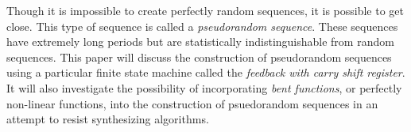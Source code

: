 \par Though it is impossible to create perfectly random sequences, it is possible to get close.
This type of sequence is called a {\em pseudorandom sequence}. These sequences have extremely
long periods but are statistically indistinguishable from random sequences. This paper will discuss
the construction of pseudorandom sequences using a particular finite state machine
called the {\em feedback with carry shift register}. It will also investigate the possibility of
incorporating {\em bent functions}, or perfectly non-linear functions, into the construction of
psuedorandom sequences in an attempt to resist synthesizing algorithms. 

